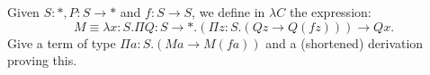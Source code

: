 \begin{problem}{6.9}
    Given $S : *, P : S \rightarrow *$ and $f : S \rightarrow S$, we define in $\lambda C$ the expression:
    $$M \equiv \lambda x : S . \Pi Q : S \rightarrow * . (\Pi z : S . (Q z \rightarrow Q(f z))) \rightarrow Q x.$$
    Give a term of type $\Pi a : S . (Ma \rightarrow M(f a))$ and a (shortened) derivation proving this.

\end{problem}